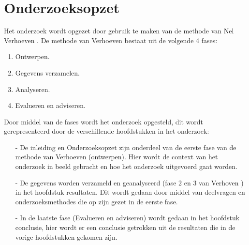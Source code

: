\section{Onderzoeksopzet}
Het onderzoek wordt opgezet door gebruik te maken van de  methode van Nel Verhoeven \Parencite{Verhoeven}.
De methode van Verhoeven bestaat uit de volgende 4 fases:

\whitespace[2]
\begin{enumerate}
    \item Ontwerpen.
    \item Gegevens verzamelen.
    \item Analyseren.
    \item Evalueren en adviseren.
\end{enumerate}

\whitespace[2]
Door middel van de fases wordt het onderzoek opgesteld, dit wordt gerepresenteerd door de verschillende hoofdstukken in het onderzoek: \\
\begin{itemize}
	\item[-]  De inleiding en Onderzoeksopzet zijn onderdeel van de eerste fase van de methode van Verhoeven (ontwerpen).
	      Hier wordt de context van het onderzoek in beeld gebracht en hoe het onderzoek uitgevoerd gaat worden.
	\item[-] De gegevens worden verzameld en geanalyseerd (fase 2 en 3 van Verhoven \Parencite{Verhoeven}) in het hoofdstuk resultaten.
	      Dit wordt gedaan door middel van deelvragen en onderzoeksmethodes die op zijn gezet in de eerste fase.
	\item[-] In de laatste fase (Evalueren en adviseren) wordt gedaan in het hoofdstuk conclusie, hier wordt er een conclusie getrokken uit de resultaten die in de vorige hoofdstukken gekomen zijn.
\end{itemize}
